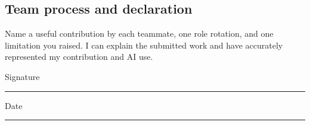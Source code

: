 \subsection*{Team process and declaration}
Name a useful contribution by each teammate, one role rotation, and one limitation you raised. I can explain the submitted work and have accurately represented my contribution and AI use.
\par\vspace{40mm}
Signature\enspace \rule{60mm}{0.4pt}\qquad Date\enspace \rule{35mm}{0.4pt}
